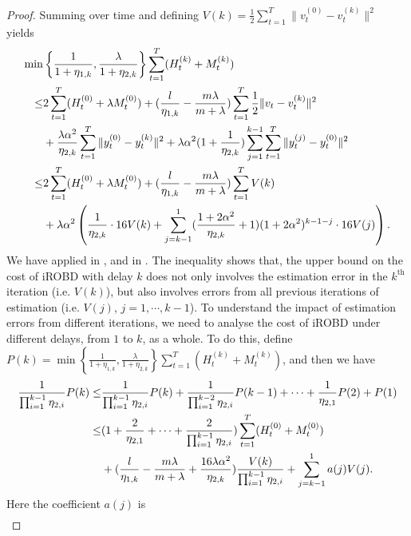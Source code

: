 \begin{proof}
Summing  over time and defining $V(k)=\frac{1}{2}\sum_{t=1}^T\|v_t^{(0)}-v_t^{(k)}\|^2$ yields 
\begin{subequations}
\begin{align}
    \min&\left\{\frac{1}{1+\eta_{1,k}},\frac{\lambda}{1+\eta_{2,k}}\right\}\sum_{t=1}^T(H_t^{(k)}+M_t^{(k)})\notag\\
\le&2\sum_{t=1}^T(H_t^{(0)}+\lambda M_t^{(0)})+(\frac{l}{\eta_{1,k}}-\frac{m\lambda}{m+\lambda})\sum_{t=1}^T\frac{1}{2}\|v_t-v_t^{(k)}\|^2\notag\\
&+\frac{\lambda\alpha^2}{\eta_{2,k}}\sum_{t=1}^T\|y_t^{(0)}-y_t^{(k)}\|^2+\lambda\alpha^2(1+\frac{1}{\eta_{2,k}})\sum_{j=1}^{k-1}\sum_{t=1}^T\|y_t^{(j)}-y_t^{(0)}\|^2\label{a.a.e.6.1}\\
\le&2\sum_{t=1}^T(H_t^{(0)}+\lambda M_t^{(0)})+(\frac{l}{\eta_{1,k}}-\frac{m\lambda}{m+\lambda})\sum_{t=1}^TV(k)\notag\\
&+\lambda\alpha^2\left(\frac{1}{\eta_{2,k}}\cdot16V(k)+\sum_{j=k-1}^1(\frac{1+2\alpha^2}{\eta_{2,k}}+1)(1+2\alpha^2)^{k-1-j}\cdot16V(j)\right)\label{a.a.e.6.2}.
\end{align}
\end{subequations}
We have applied  in , and  in . The inequality shows that, the upper bound on the cost of iROBD with delay $k$ does not only involves the estimation error in the $k^\mathrm{th}$ iteration (i.e. $V(k)$), but also involves errors from all previous iterations of estimation (i.e. $V(j)$, $j=1,\cdots,k-1$). To understand the impact of estimation errors from different iterations, we need to analyse the cost of iROBD under different delays, from $1$ to $k$, as a whole. To do this, define $P(k)=\min\left\{\frac{1}{1+\eta_{1,k}},\frac{\lambda}{1+\eta_{2,k}}\right\}\sum_{t=1}^T(H_t^{(k)}+M_t^{(k)})$, and then we have
\begin{align}
\frac{1}{\prod_{i=1}^{k-1}\eta_{2,i}}P(k)
    \le&\frac{1}{\prod_{i=1}^{k-1}\eta_{2,i}}P(k)+\frac{1}{\prod_{i=1}^{k-2}\eta_{2,i}}P(k-1)+\cdots+\frac{1}{\eta_{2,1}}P(2)+P(1)\notag\\
    \le&(1+\frac{2}{\eta_{2,1}}+\cdots+\frac{2}{\prod_{i=1}^{k-1}\eta_{2,i}})\sum_{t=1}^T(H_t^{(0)}+M_t^{(0)})\notag\\
    &+(\frac{l}{\eta_{1,k}}-\frac{m\lambda}{m+\lambda}+\frac{16\lambda\alpha^2}{\eta_{2,k}})\frac{V(k)}{\prod_{i=1}^{k-1}\eta_{2,i}}+\sum_{j=k-1}^1a(j)V(j).
\end{align}
Here the coefficient $a(j)$ is
\begin{align}

\end{align}
\end{proof}
